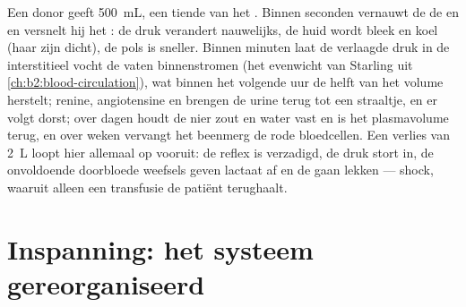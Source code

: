 \begin{example}\label{ex:b2:blood-pressure:haemorrhage}
Een donor geeft \qty{500}{mL}, een tiende van het . Binnen seconden
vernauwt de  de  en  en versnelt hij het : de
druk verandert nauwelijks, de huid wordt bleek en koel (haar  zijn
dicht), de pols is sneller. Binnen minuten laat de verlaagde druk in de
 interstitieel vocht de vaten binnenstromen (het evenwicht van
Starling uit \cref{ch:b2:blood-circulation}), wat binnen het volgende uur de
helft van het volume herstelt; renine, angiotensine en 
brengen de urine terug tot een straaltje, en er volgt dorst; over dagen houdt
de nier zout en water vast en is het plasmavolume terug, en over weken
vervangt het beenmerg de rode bloedcellen. Een verlies van \qty{2}{L} loopt
hier allemaal op vooruit: de reflex is verzadigd, de druk stort in, de
onvoldoende doorbloede weefsels geven lactaat af en de  gaan
lekken --- shock, waaruit alleen een transfusie de patiënt terughaalt.
\end{example}

\section{Inspanning: het systeem gereorganiseerd}

